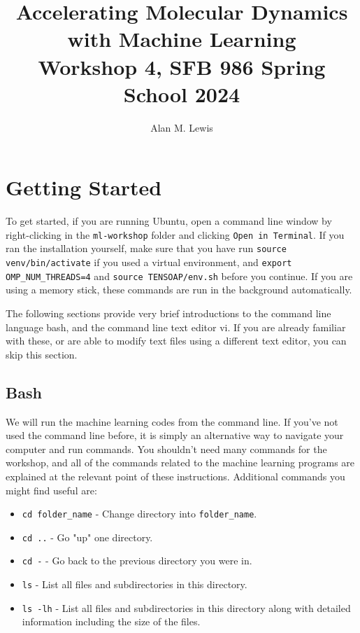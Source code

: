 \documentclass{article}
\title{Accelerating Molecular Dynamics with Machine Learning \\ Workshop 4, SFB 986 Spring School 2024}
\author{Alan M. Lewis}
\date{}
\begin{document}
\maketitle

\section{Getting Started}


To get started, if you are running Ubuntu, open a command line window by right-clicking in the \verb|ml-workshop| folder and clicking \verb|Open in Terminal|. If you ran the installation yourself, make sure that you have run \verb|source venv/bin/activate| if you used a virtual environment, and \verb|export OMP_NUM_THREADS=4| and \verb|source TENSOAP/env.sh| before you continue. If you are using a memory stick, these commands are run in the background automatically.

The following sections provide very brief introductions to the command line language bash, and the command line text editor vi. If you are already familiar with these, or are able to modify text files using a different text editor, you can skip this section.

\subsection{Bash}

We will run the machine learning codes from the command line. If you've not used the command line before, it is simply an alternative way to navigate your computer and run commands. You shouldn't need many commands for the workshop, and all of the commands related to the machine learning programs are explained at the relevant point of these instructions. Additional commands you might find useful are:

\begin{itemize}

\item \verb|cd folder_name| - Change directory into \verb|folder_name|.
\item \verb|cd ..| - Go "up" one directory.
\item \verb|cd -| - Go back to the previous directory you were in.
\item \verb|ls| - List all files and subdirectories in this directory.
\item \verb|ls -lh| - List all files and subdirectories in this directory along with detailed information including the size of the files.

\end{itemize}
\end{document}

